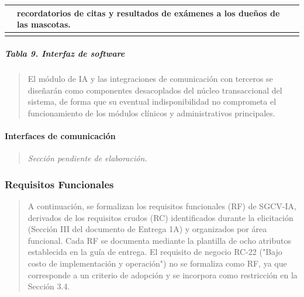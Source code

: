 \documentclass[
]{article}
\newcounter{none} %
\begin{document}
{\def\LTcaptype{none} %
\begin{longtable}[]{@{}
  >{\raggedright\arraybackslash}p{}
  >{\raggedright\arraybackslash}p{}
  >{\raggedright\arraybackslash}p{}@{}}
\toprule\noalign{}
\begin{minipage}[b]{\linewidth}\raggedright
\end{minipage} & \begin{minipage}[b]{\linewidth}\raggedright
recordatorios de citas y resultados de exámenes a los dueños de las
mascotas.
\end{minipage} & \begin{minipage}[b]{\linewidth}\raggedright
\end{minipage} \\
\midrule\noalign{}
\endhead
\bottomrule\noalign{}
\endlastfoot
\end{longtable}
}

\subparagraph{Tabla 9. Interfaz de
software}\label{tabla-9.-interfaz-de-software}

\begin{quote}
El módulo de IA y las integraciones de comunicación con terceros se
diseñarán como componentes desacoplados del núcleo transaccional del
sistema, de forma que su eventual indisponibilidad no comprometa el
funcionamiento de los módulos clínicos y administrativos principales.
\end{quote}

\paragraph{Interfaces de
comunicación}\label{interfaces-de-comunicaciuxf3n}

\begin{quote}
\emph{Sección pendiente de elaboración.}
\end{quote}

\subsubsection{Requisitos Funcionales}\label{requisitos-funcionales}

\begin{quote}
A continuación, se formalizan los requisitos funcionales (RF) de
SGCV-IA, derivados de los requisitos crudos (RC) identificados durante
la elicitación (Sección III del documento de Entrega 1A) y organizados
por área funcional. Cada RF se documenta mediante la plantilla de ocho
atributos establecida en la guía de entrega. El requisito de negocio
RC-22 ("Bajo costo de implementación y operación") no se formaliza como
RF, ya que corresponde a un criterio de adopción y se incorpora como
restricción en la Sección 3.4.
\end{quote}
\end{document}
